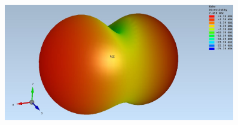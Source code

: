 \begin{figure}
	\begin{center}
		\includegraphics[width=0.9\textwidth]{content/bilder/Evaluation/Loop/Kurz3/EMFraField_Loop_2ABS_kurz3.JPG}
		\label{fig:sim_Loop_3Fach_2ABS_3D}
	\end{center}
\end{figure}
\clearpage





